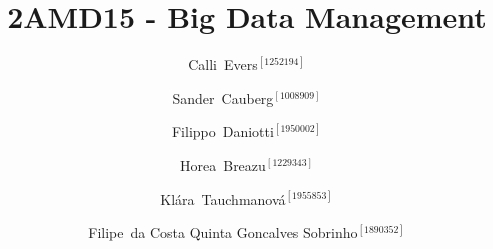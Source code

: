 \documentclass[onecolumn,10pt]{IEEEtran}
\begin{document}
\title{2AMD15 - Big Data Management}

\author{
Calli~Evers$^{[1252194]}$ \and 
Sander~Cauberg$^{[1008909]}$ \and
Filippo~Daniotti$^{[1950002]}$ \and
Horea~Breazu$^{[1229343]}$ \and 
Klára~Tauchmanová$^{[1955853]}$ \and
Filipe~da Costa Quinta Goncalves Sobrinho$^{[1890352]}$ 
}
%
\maketitle
%

% 
% 



% 



\end{document}

